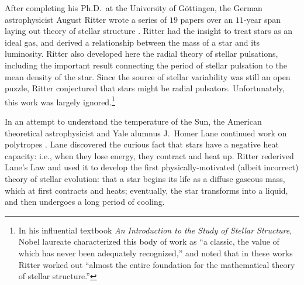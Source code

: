 After completing his Ph.D.\ at the University of G\"ottingen, the German astrophysicist August Ritter wrote a series of $19$ papers over an $11$-year span laying out theory of stellar structure \citep[1878--1889, e.g.,][]{ritter}. 
Ritter had the insight to treat stars as an ideal gas, and derived a relationship between the mass of a star and its luminosity. 
Ritter also developed here the radial theory of stellar pulsations, including the important result connecting the period of stellar pulsation to the mean density of the star. 
Since the source of stellar variability was still an open puzzle, Ritter conjectured that stars might be radial pulsators. 
Unfortunately, this work was largely ignored.\footnote{ In his influential textbook \emph{An Introduction to the Study of Stellar Structure}, Nobel laureate \citet{1939isss.book.....C} characterized this body of work as ``a classic, the value of which has never been adequately recognized,'' and noted that in these works Ritter worked out ``almost the entire foundation for the mathematical theory of stellar structure.''} 

In an attempt to understand the temperature of the Sun, the American theoretical astrophysicist and Yale alumnus J.\ Homer Lane continued work on polytropes \citep[e.g.,][]{1870AmJS...50...57L}. 
Lane discovered the curious fact that stars have a negative heat capacity: i.e., when they lose energy, they contract and heat up. 
Ritter rederived Lane's Law and used it to develop the first physically-motivated (albeit incorrect) theory of stellar evolution: that a star begins its life as a diffuse gaseous mass, which at first contracts and heats; eventually, the star transforms into a liquid, and then undergoes a long period of cooling. 

